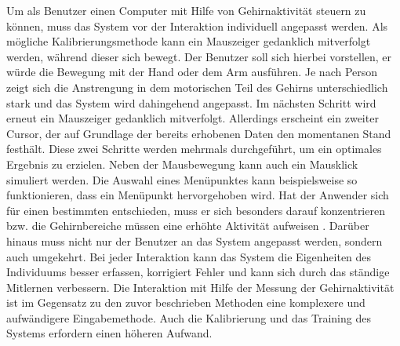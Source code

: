 \newline \newline
Um als Benutzer einen Computer mit Hilfe von Gehirnaktivität steuern zu können, muss das System vor der Interaktion individuell angepasst werden. Als mögliche Kalibrierungsmethode kann ein Mauszeiger gedanklich mitverfolgt werden, während dieser sich bewegt. Der Benutzer soll sich hierbei vorstellen, er würde die Bewegung mit der Hand oder dem Arm ausführen. Je nach Person zeigt sich die Anstrengung in dem motorischen Teil des Gehirns unterschiedlich stark und das System wird dahingehend angepasst. Im nächsten Schritt wird erneut ein Mauszeiger gedanklich mitverfolgt. Allerdings erscheint ein zweiter Cursor, der auf Grundlage der bereits erhobenen Daten den momentanen Stand festhält. Diese zwei Schritte werden mehrmals durchgeführt, um ein optimales Ergebnis zu erzielen. Neben der Mausbewegung kann auch ein Mausklick simuliert werden. Die Auswahl eines Menüpunktes kann beispielsweise so funktionieren, dass ein Menüpunkt hervorgehoben wird. Hat der Anwender sich für einen bestimmten entschieden, muss er sich besonders darauf konzentrieren bzw. die Gehirnbereiche müssen eine erhöhte Aktivität aufweisen \cite{BrainInt}.
\newline
Darüber hinaus muss nicht nur der Benutzer an das System angepasst werden, sondern auch umgekehrt. Bei jeder Interaktion kann das System die Eigenheiten des Individuums besser erfassen, korrigiert Fehler und kann sich durch das ständige Mitlernen verbessern. 
\newline \newline
Die Interaktion mit Hilfe der Messung der Gehirnaktivität ist im Gegensatz zu den zuvor beschrieben Methoden eine komplexere und aufwändigere Eingabemethode. Auch die Kalibrierung und das Training des Systems erfordern einen höheren Aufwand.
